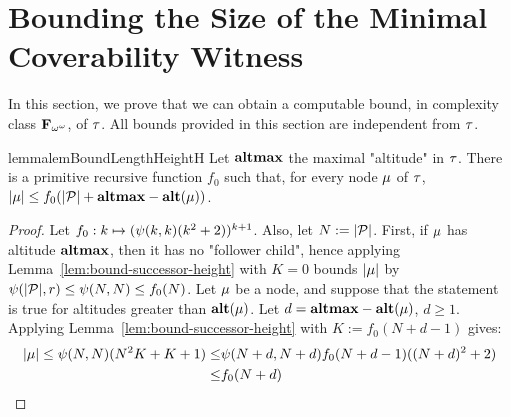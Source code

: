 \section{Bounding the Size of the Minimal Coverability Witness}
\label{app:proofs_bounds}

In this section, we prove that we can obtain a computable bound, in complexity class $\mathbf{F}_{\omega^{\omega}}$, of $\tau$. All bounds provided in this section are independent from $\tau$. 

\begin{restatable}{lemma}{lemBoundLengthHeightH}
	\label{lem:bound-length-at-height-h}
	Let $\mathbf{altmax}$ the maximal "altitude" in $\tau$. There is a primitive recursive function $f_0$ such that, for every node $\mu$ of $\tau$, $|\mu| \leq f_0(|\mathcal{P}| + \mathbf{altmax} - \mathbf{alt}(\mu))$.
\end{restatable}
\begin{proof}
Let $f_0: k \mapsto (\psi(k,k) (k^2 +2))^{k+1}$. Also, let $N := |\mathcal{P}|$.
First, if $\mu$ has altitude $\mathbf{altmax}$, then it has no "follower child", hence applying Lemma~\ref{lem:bound-successor-height} with $K=0$ bounds $|\mu|$ by $\psi(|\mathcal{P}|,r) \leq \psi(N,N) \leq f_0(N)$. Let $\mu$ be a node, and suppose that the statement is true for altitudes greater than $\mathbf{alt}(\mu)$. Let $d = \mathbf{altmax} - \mathbf{alt}(\mu)$, $d\geq 1$. Applying Lemma~\ref{lem:bound-successor-height} with $K := f_0(N + d - 1)$ gives: 
\begin{align*}
|\mu| \leq \psi(N,N) (N^2 K + K + 1) \leq & \psi(N+d,N+d) f_0(N+d-1) ((N+d)^2 +2)   \\ \leq & f_0(N+d) 
\end{align*}
\end{proof}

	
		
